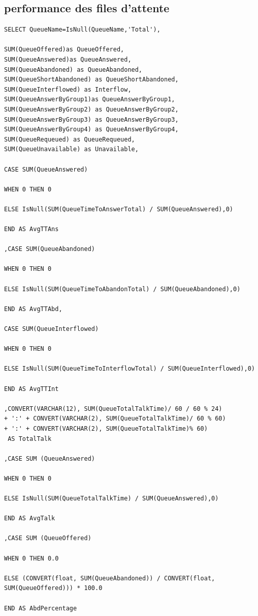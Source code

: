 \documentclass[a4paper,12pt]{report}
\begin{document}
\subsection{performance des files d'attente}

\lstset{
language=SQL,
basicstyle=\footnotesize,
}
\begin{lstlisting}
SELECT QueueName=IsNull(QueueName,'Total'),

SUM(QueueOffered)as QueueOffered,
SUM(QueueAnswered)as QueueAnswered,
SUM(QueueAbandoned) as QueueAbandoned,
SUM(QueueShortAbandoned) as QueueShortAbandoned,
SUM(QueueInterflowed) as Interflow,
SUM(QueueAnswerByGroup1)as QueueAnswerByGroup1,
SUM(QueueAnswerByGroup2) as QueueAnswerByGroup2,
SUM(QueueAnswerByGroup3) as QueueAnswerByGroup3,
SUM(QueueAnswerByGroup4) as QueueAnswerByGroup4,
SUM(QueueRequeued) as QueueRequeued,
SUM(QueueUnavailable) as Unavailable,

CASE SUM(QueueAnswered)

WHEN 0 THEN 0

ELSE IsNull(SUM(QueueTimeToAnswerTotal) / SUM(QueueAnswered),0)

END AS AvgTTAns

,CASE SUM(QueueAbandoned)

WHEN 0 THEN 0

ELSE IsNull(SUM(QueueTimeToAbandonTotal) / SUM(QueueAbandoned),0)

END AS AvgTTAbd,

CASE SUM(QueueInterflowed)

WHEN 0 THEN 0

ELSE IsNull(SUM(QueueTimeToInterflowTotal) / SUM(QueueInterflowed),0)

END AS AvgTTInt

,CONVERT(VARCHAR(12), SUM(QueueTotalTalkTime)/ 60 / 60 % 24) 
+ ':' + CONVERT(VARCHAR(2), SUM(QueueTotalTalkTime)/ 60 % 60) 
+ ':' + CONVERT(VARCHAR(2), SUM(QueueTotalTalkTime)% 60) 
 AS TotalTalk

,CASE SUM (QueueAnswered)

WHEN 0 THEN 0

ELSE IsNull(SUM(QueueTotalTalkTime) / SUM(QueueAnswered),0)

END AS AvgTalk

,CASE SUM (QueueOffered)

WHEN 0 THEN 0.0

ELSE (CONVERT(float, SUM(QueueAbandoned)) / CONVERT(float, SUM(QueueOffered))) * 100.0

END AS AbdPercentage


\end{lstlisting}
\end{document}
